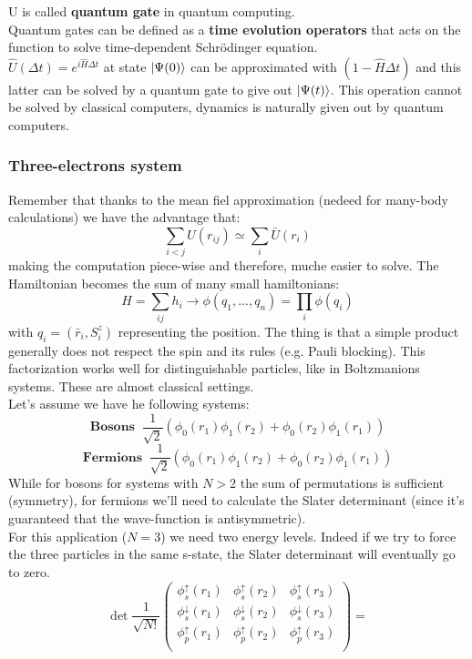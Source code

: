U is called \textbf{quantum gate} in quantum computing.\\
Quantum gates can be defined as a \textbf{time evolution operators} that acts on the function to solve time-dependent Schr\"odinger equation.\\
$\hat{U}(\Delta t) = e^{i\hat{H}\Delta t}$ at state $\ket{\Psi(0)}$ can be approximated with $(1-\hat{H}\Delta t)$ and this latter can be solved by a quantum gate to give out $\ket{\Psi(t)}$. This operation cannot be solved by classical computers, dynamics is naturally given out by quantum computers.\\

\subsubsection{Three-electrons system}
Remember that thanks to the mean fiel approximation (nedeed for many-body calculations) we have the advantage that:
\[
\sum_{i<j} U(r_{ij}) \simeq \sum_i \bar{U}(r_i)
\]
making the computation piece-wise and therefore, muche easier to solve. 
The Hamiltonian becomes the sum of many small hamiltonians: 
\[
H = \sum_{ij} h_i \rightarrow \phi(q_1, ... , q_n) = \prod_i \phi(q_i)
\]
with $q_i = (\bar{r}_i, S^z_i)$ representing the position. The thing is that a simple product generally does not respect the spin and its rules (e.g. Pauli blocking). This factorization works well for distinguishable particles, like in Boltzmanions systems. These are almost classical settings. \\
Let's assume we have he following systems:
\[
\textbf{Bosons} \;\; \frac{1}{\sqrt{2}}(\phi_0(r_1)\phi_1(r_2) + \phi_0(r_2)\phi_1(r_1))
\]
\[
\textbf{Fermions} \;\; \frac{1}{\sqrt{2}}(\phi_0(r_1)\phi_1(r_2) + \phi_0(r_2)\phi_1(r_1))
\]
While for bosons for systems with $N>2$ the sum of permutations is sufficient (symmetry), for fermions we'll need to calculate the Slater determinant (since it's guaranteed that the wave-function is antisymmetric). \\ 
For this application ($N = 3 $) we need two energy levels. Indeed if we try to force the three particles in the same s-state, the Slater determinant will eventually go to zero.\\
\[
\det\frac{1}{\sqrt{N!}}
\begin{pmatrix}
\phi_s^\uparrow(r_1)&\phi_s^\uparrow(r_2)&\phi_s^\uparrow(r_3)\\
\phi_s^\downarrow(r_1)&\phi_s^\downarrow(r_2)&\phi_s^\downarrow(r_3)\\
\phi_p^\uparrow(r_1)&\phi_p^\uparrow(r_2)&\phi_p^\uparrow(r_3)\\
\end{pmatrix}=
\]
